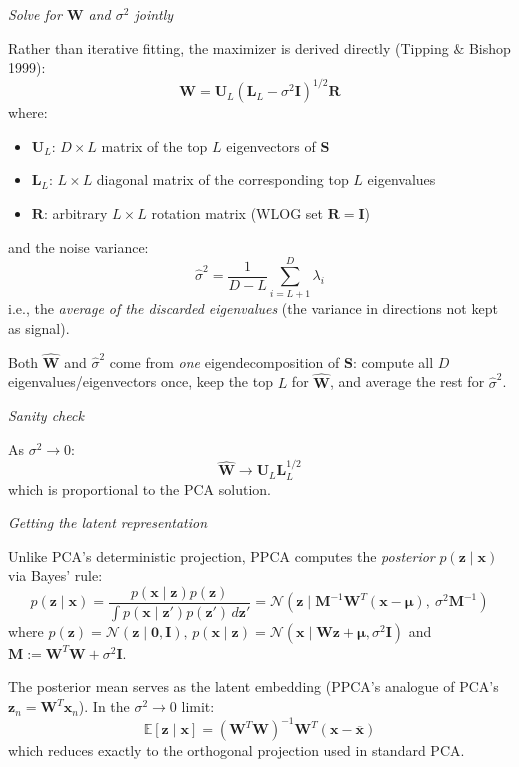 \documentclass[11pt]{article}
\begin{document}
\par\medskip
\noindent \textit{Solve for $\mathbf{W}$ and $\sigma^2$ jointly}

Rather than iterative fitting, the maximizer is derived directly (Tipping $\&$ Bishop 1999):
\[
\mathbf{W} = \mathbf{U}_L(\mathbf{L}_L - \sigma^2\mathbf{I})^{1/2}\mathbf{R}
\]
where:
\begin{itemize}
  \item $\mathbf{U}_L$: $D\times L$ matrix of the top $L$ eigenvectors of $\mathbf{S}$
  \item $\mathbf{L}_L$: $L\times L$ diagonal matrix of the corresponding top $L$ eigenvalues
  \item $\mathbf{R}$: arbitrary $L\times L$ rotation matrix (WLOG set $\mathbf{R}=\mathbf{I}$)
\end{itemize}
and the noise variance:
\[
\hat{\sigma}^2 = \frac{1}{D-L}\sum_{i=L+1}^{D}\lambda_i
\]
i.e., the \emph{average of the discarded eigenvalues} (the variance in directions not kept as signal).

Both $\hat{\mathbf{W}}$ and $\hat\sigma^2$ come from \emph{one} eigendecomposition of $\mathbf{S}$: compute all $D$ eigenvalues/eigenvectors once, keep the top $L$ for $\hat{\mathbf{W}}$, and average the rest for $\hat\sigma^2$.

\par\medskip
\noindent \textit{Sanity check}

As $\sigma^2 \to 0$:
\[
\hat{\mathbf{W}} \to \mathbf{U}_L\mathbf{L}_L^{1/2}
\]
which is proportional to the PCA solution.

\par\medskip
\noindent \textit{Getting the latent representation}

Unlike PCA's deterministic projection, PPCA computes the \emph{posterior} $p(\mathbf{z}\mid\mathbf{x})$ via Bayes' rule:
\[
p(\mathbf{z}\mid\mathbf{x}) = \frac{p(\mathbf{x}\mid\mathbf{z})p(\mathbf{z})}{\int p(\mathbf{x}\mid\mathbf{z}')p(\mathbf{z}')\,d\mathbf{z}'} = \mathcal{N}(\mathbf{z}\mid\mathbf{M}^{-1}\mathbf{W}^T(\mathbf{x}-\boldsymbol{\mu}),\ \sigma^2\mathbf{M}^{-1})
\]
where $p(\mathbf{z}) = \mathcal{N}(\mathbf{z}\mid\mathbf{0},\mathbf{I}), \, p(\mathbf{x}\mid\mathbf{z}) = \mathcal{N}(\mathbf{x}\mid\mathbf{Wz}+\boldsymbol{\mu},\sigma^2\mathbf{I})$ and $\mathbf{M} := \mathbf{W}^T\mathbf{W}+\sigma^2\mathbf{I}$.

The posterior mean serves as the latent embedding (PPCA's analogue of PCA's $\mathbf{z}_n=\mathbf{W}^T\mathbf{x}_n$). In the $\sigma^2\to0$ limit:
\[
\mathbb{E}[\mathbf{z}\mid\mathbf{x}] = (\mathbf{W}^T\mathbf{W})^{-1}\mathbf{W}^T(\mathbf{x}-\overline{\mathbf{x}})
\]
which reduces exactly to the orthogonal projection used in standard PCA.
\end{document}
